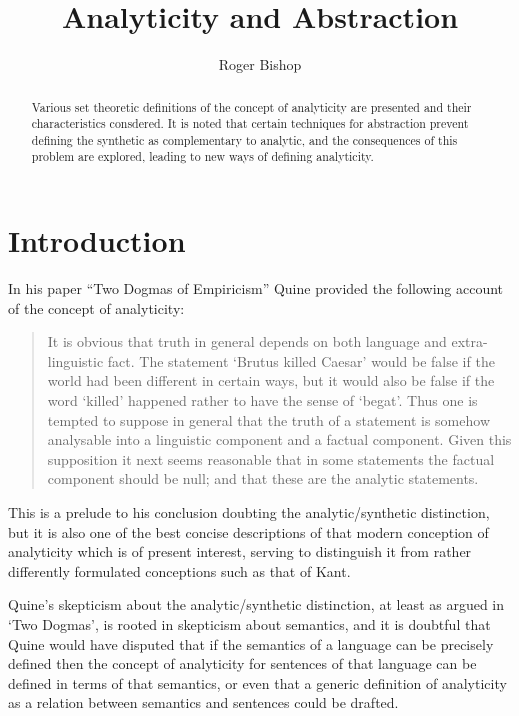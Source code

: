 \documentclass{rbjk}
\begin{document}
                                                                                   
\begin{article}
\begin{opening}  
\title{Analyticity and Abstraction}
\author{Roger Bishop }

\begin{abstract}
Various set theoretic definitions of the concept of analyticity are presented and their characteristics consdered.
It is noted that certain techniques for abstraction prevent defining the synthetic as complementary to analytic, and the consequences of this problem are explored, leading to new ways of defining analyticity.
\end{abstract}
\end{opening}

\section{Introduction}

In his paper ``Two Dogmas of Empiricism'' \cite{Quine53} Quine provided the following account of the concept of analyticity:

\begin{quote}
 It is obvious that truth in general depends on both language and extra-linguistic fact. The statement `Brutus killed Caesar' would be false if the world had been different in certain ways, but it would also be false if the word `killed' happened rather to have the sense of `begat'. Thus one is tempted to suppose in general that the truth of a statement is somehow analysable into a linguistic component and a factual component.
 Given this supposition it next seems reasonable that in some statements the factual component should be null; and that these are the analytic statements.
\end{quote}

This is a prelude to his conclusion doubting the analytic/synthetic distinction, but it is also one of the best concise descriptions of that modern conception of analyticity which is of present interest, serving to distinguish it from rather differently formulated conceptions such as that of Kant.

Quine's skepticism about the analytic/synthetic distinction, at least as argued in `Two Dogmas', is rooted in skepticism about semantics, and it is doubtful that Quine would have disputed that if the semantics of a language can be precisely defined then the concept of analyticity for sentences of that language can be defined in terms of that semantics, or even that a generic definition of analyticity as a relation between semantics and sentences could be drafted.


\end{article}
\end{document}
